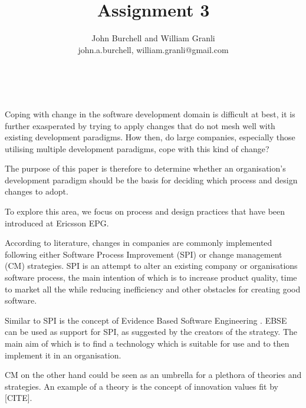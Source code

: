 \documentclass[times, 10pt,twocolumn]{Article}
\begin{document}
\title{Assignment 3}

\author{John Burchell and William Granli \\
john.a.burchell, william.granli@gmail.com}


\maketitle
\thispagestyle{empty}



​

Coping with change in the software development domain is difficult at best, it is further exasperated by trying to apply changes that do not mesh well with existing development paradigms. How then, do large companies, especially those utilising multiple development paradigms, cope with this kind of change?

The purpose of this paper is therefore to determine whether an organisation's development paradigm should be the basis for deciding which process and design changes to adopt. 

To explore this area, we focus on process and design practices that have been introduced at Ericsson EPG.


According to literature, changes in companies are commonly implemented following either Software Process Improvement (SPI)\cite{pettersson2008practitioner}\cite{unterkalmsteiner2012evaluation} or change management (CM) strategies. SPI is an attempt to alter an existing company or organisations software process, the main intention of which is to increase product quality, time to market all the while reducing inefficiency and other obstacles for creating good software. 

Similar to SPI is the concept of Evidence Based Software Engineering \cite{dyba2005evidence}. EBSE can be used as support for SPI, as suggested by the creators of the strategy. The main aim of which is to find a technology which is suitable for use and to then implement it in an organisation.

CM on the other hand could be seen as an umbrella for a plethora of theories and strategies. An example of a theory is the concept of innovation values fit by [CITE].
\end{document}
